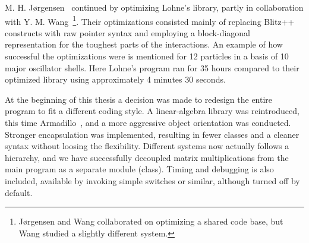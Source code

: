 M. H. Jørgensen~\cite{marte} continued by optimizing Lohne's library, partly in collaboration with Y. M. Wang~\cite{ymwang}\footnote{Jørgensen and Wang collaborated on optimizing a shared code base, but Wang studied a slightly different system.}.
Their optimizations consisted mainly of replacing Blitz++ constructs with raw pointer syntax and employing a block-diagonal representation for the toughest parts of the interactions.
An example of how successful the optimizations were is mentioned for 12 particles in a basis of 10 major oscillator shells.
Here Lohne's program ran for 35 hours compared to their optimized library using approximately 4 minutes 30 seconds.

At the beginning of this thesis a decision was made to redesign the entire program to fit a different coding style.
A linear-algebra library was reintroduced, this time Armadillo~\cite{armadillo}, and a more aggressive object orientation was conducted.
Stronger encapsulation was implemented, resulting in fewer classes and a cleaner syntax without loosing the flexibility.
Different systems now actually follows a hierarchy, and we have successfully decoupled matrix multiplications from the main program as a separate module (class).
Timing and debugging is also included, available by invoking simple switches or similar, although turned off by default.

